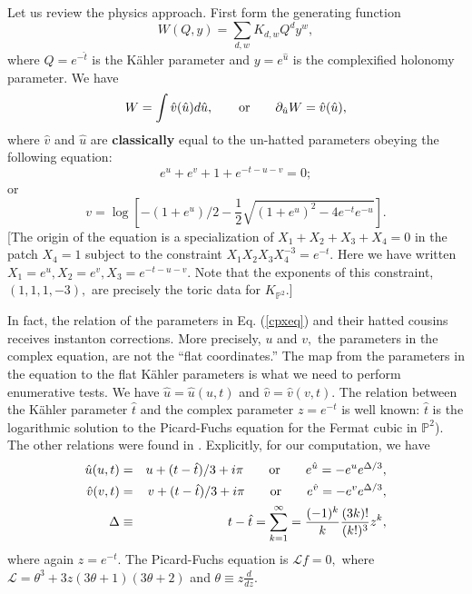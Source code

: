 \documentclass[a4paper,11pt]{article}
\newcommand{\PP}{{\mathbb{P}}}
\begin{document}
Let us review the physics approach.  
First form the generating function
\begin{equation}
\label{gwgenfun}
W(Q,y) = \sum_{d,w} K_{d,w} Q^d y^w,
\end{equation}
where $Q = e^{-\hat{t}}$ is
the K\"ahler parameter
and $y = e^{\hat{u}}$ is the complexified
holonomy parameter.
%
We have
\begin{equation}
W = \int \hat{v}(\hat{u}) d\hat{u},\qquad {\rm or}\qquad
\partial_{\hat{u}} W = \hat{v}(\hat{u}),
\end{equation}
where
$\hat{v}$ and $\hat{u}$
are {\bf classically} equal to the
un-hatted parameters
obeying the following equation:
\begin{equation}
\label{cpxeq}
e^u + e^v + 1 + e^{-t - u - v} = 0;
\end{equation}
or
\begin{equation}
\label{cpxeqsol}
v =
\log\left[-(1+e^u)/2 - \frac{1}{2}
\sqrt{(1+e^u)^2-4e^{-t}e^{-u}}\right].
\end{equation}
[The origin of the equation is a specialization
of $X_1 + X_2 + X_3 + X_4 = 0$ in the patch
$X_4 = 1$ subject to the constraint
$X_1 X_2 X_3 X_4^{-3} = e^{-t}.$
Here we have written $X_1 = e^u, X_2 = e^v, X_3 = e^{-t-u-v}.$
Note that the exponents of this constraint, $(1,1,1,-3),$
are precisely the toric data for $K_{\PP^2}$.]

In fact, the relation of the parameters in
Eq. \!\!(\ref{cpxeq}) and their hatted cousins
receives instanton corrections.
More precisely, $u$ and $v,$ the parameters in the
complex equation, are not the
``flat coordinates.''
The map from the parameters in the equation to the
flat K\"ahler parameters is what we need to perform
enumerative tests.
We have
$\hat{u}=\hat{u}(u,t)$ and $\hat{v}=\hat{v}(v,t).$
The relation between the K\"ahler
parameter $\hat{t}$ and the complex parameter $z = e^{-t}$
is well known:  $\hat{t}$ is the logarithmic
solution to the Picard-Fuchs equation for the Fermat
cubic in ${\mathbb P}^2$).  The other relations
were found in \cite{AKV}.
Explicitly,
for our computation, we have
\begin{eqnarray}
\label{hateq1}
\hat{u}(u,t) &=& u + (t - \hat{t})/3 + i\pi \qquad
{\rm or}\qquad e^{\hat{u}} = -e^u e^{\Delta/3},\\
\label{hateq2}
\hat{v}(v,t) &=& v + (t - \hat{t})/3 + i\pi  \qquad
{\rm or}\qquad e^{\hat{v}} = -e^v e^{\Delta/3},\\
\label{hateq3}
\Delta &\equiv& t - \hat{t} =  \sum_{k=1}^{\infty} = \frac{(-1)^k}{k}
\frac{(3k)!}{(k!)^3}z^k,
\end{eqnarray}
where again $z = e^{-t}.$
The Picard-Fuchs equation is
${\mathcal L}f = 0,$ where ${\mathcal L} = \theta^3 
+ 3z(3\theta + 1)(3\theta + 2)$ and $\theta \equiv
z\frac{d}{dz}.$
\end{document}
